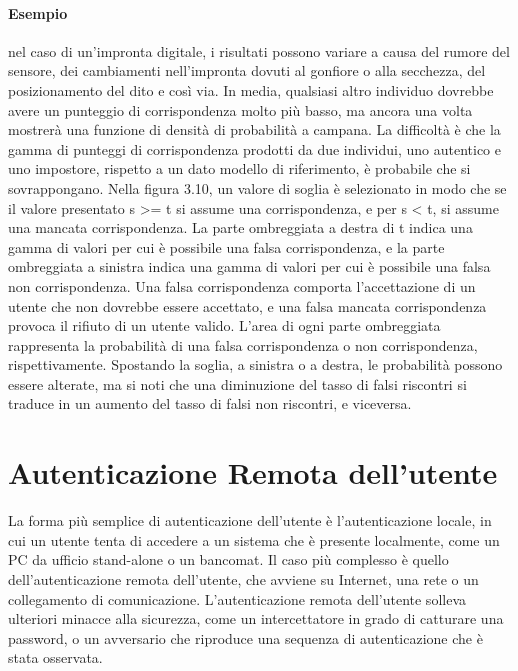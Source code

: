 \paragraph{Esempio} nel caso di un'impronta digitale, i risultati possono variare a causa del rumore del sensore, dei cambiamenti nell'impronta dovuti al gonfiore o alla secchezza, del posizionamento del dito e così via. In media, qualsiasi altro individuo dovrebbe avere un punteggio di corrispondenza molto più basso, ma ancora una volta mostrerà una funzione di densità di probabilità a campana. La difficoltà è che la gamma di punteggi di corrispondenza prodotti da due individui, uno autentico e uno impostore, rispetto a un dato modello di riferimento, è probabile che si sovrappongano. Nella figura 3.10, un valore di soglia è selezionato in modo che se il valore presentato s >= t si assume una corrispondenza, e per s < t, si assume una mancata corrispondenza. La parte ombreggiata a destra di t indica una gamma di valori per cui è possibile una falsa corrispondenza, e la parte ombreggiata a sinistra indica una gamma di valori per cui è possibile una falsa non corrispondenza. Una falsa corrispondenza comporta l'accettazione di un utente che non dovrebbe essere accettato, e una falsa mancata corrispondenza provoca il rifiuto di un utente valido. L'area di ogni parte ombreggiata rappresenta la probabilità di una falsa corrispondenza o non corrispondenza, rispettivamente. Spostando la soglia, a sinistra o a destra, le probabilità possono essere alterate, ma si noti che una diminuzione del tasso di falsi riscontri si traduce in un aumento del tasso di falsi non riscontri, e viceversa.
\section{Autenticazione Remota dell'utente}
La forma più semplice di autenticazione dell'utente è l'autenticazione locale, in cui un utente tenta di accedere a un sistema che è presente localmente, come un PC da ufficio stand-alone o un bancomat. Il caso più complesso è quello dell'autenticazione remota dell'utente, che avviene su Internet, una rete o un collegamento di comunicazione. L'autenticazione remota dell'utente solleva ulteriori minacce alla sicurezza, come un intercettatore in grado di catturare una password, o un avversario che riproduce una sequenza di autenticazione che è stata osservata.
\newpage

